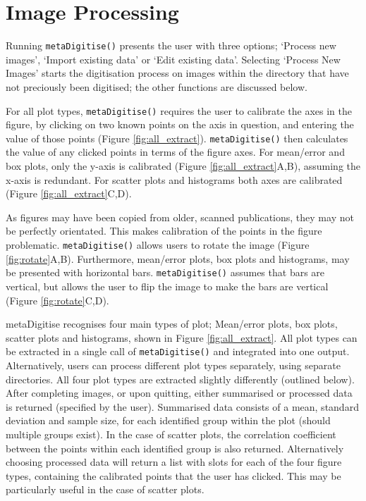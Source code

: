 \documentclass[12pt]{article}
\newcommand{\fct}[1]{\texttt{#1()}}
\newcommand{\pkg}[1]{{\fontseries{b}\selectfont #1}}
\begin{document}


\section{Image Processing}
Running \fct{metaDigitise} presents the user with three options; `Process new images', `Import existing data' or `Edit existing data'. Selecting `Process New Images' starts the digitisation process on images within the directory that have not preciously been digitised; the other functions are discussed below.

For all plot types, \fct{metaDigitise} requires the user to calibrate the axes in the figure, by clicking on two known points on the axis in question, and entering the value of those points (Figure \ref{fig:all_extract}). \fct{metaDigitise} then calculates the value of any clicked points in terms of the figure axes. For mean/error and box plots, only the y-axis is calibrated (Figure \ref{fig:all_extract}A,B), assuming the x-axis is redundant. For scatter plots and histograms both axes are calibrated (Figure \ref{fig:all_extract}C,D).

As figures may have been copied from older, scanned publications, they may not be perfectly orientated. This makes calibration of the points in the figure problematic. \fct{metaDigitise} allows users to rotate the image (Figure \ref{fig:rotate}A,B). Furthermore, mean/error plots, box plots and histograms, may be presented with horizontal bars. \fct{metaDigitise} assumes that bars are vertical, but allows the user to flip the image to make the bars are vertical (Figure \ref{fig:rotate}C,D).

\pkg{metaDigitise} recognises four main types of plot; Mean/error plots, box plots, scatter plots and histograms, shown in Figure \ref{fig:all_extract}. All plot types can be extracted in a single call of \fct{metaDigitise} and integrated into one output. Alternatively, users can process different plot types separately, using separate directories. All four plot types are extracted slightly differently (outlined below). After completing images, or upon quitting, either summarised or processed data is returned (specified by the user). Summarised data consists of a mean, standard deviation and sample size, for each identified group within the plot (should multiple groups exist). In the case of scatter plots, the correlation coefficient between the points within each identified group is also returned. Alternatively choosing processed data will return a list with slots for each of the four figure types, containing the calibrated points that the user has clicked. This may be particularly useful in the case of scatter plots. 
\end{document}
